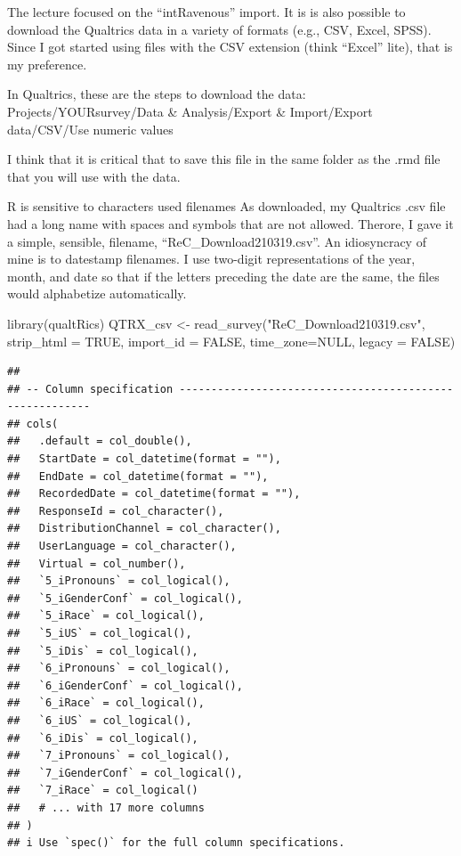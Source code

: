 \documentclass[
  english,
]{book}
\newenvironment{Shaded}{\begin{snugshade}}{\end{snugshade}}
\newcommand{\AttributeTok}[1]{\textcolor[rgb]{0.77,0.63,0.00}{#1}}
\newcommand{\ConstantTok}[1]{\textcolor[rgb]{0.00,0.00,0.00}{#1}}
\newcommand{\FunctionTok}[1]{\textcolor[rgb]{0.00,0.00,0.00}{#1}}
\newcommand{\NormalTok}[1]{#1}
\newcommand{\OtherTok}[1]{\textcolor[rgb]{0.56,0.35,0.01}{#1}}
\newcommand{\StringTok}[1]{\textcolor[rgb]{0.31,0.60,0.02}{#1}}
\begin{document}
The lecture focused on the ``intRavenous'' import. It is is also possible to download the Qualtrics data in a variety of formats (e.g., CSV, Excel, SPSS). Since I got started using files with the CSV extension (think ``Excel'' lite), that is my preference.

In Qualtrics, these are the steps to download the data: Projects/YOURsurvey/Data \& Analysis/Export \& Import/Export data/CSV/Use numeric values

I think that it is critical that to save this file in the same folder as the .rmd file that you will use with the data.

R is sensitive to characters used filenames As downloaded, my Qualtrics .csv file had a long name with spaces and symbols that are not allowed. Therore, I gave it a simple, sensible, filename, ``ReC\_Download210319.csv''. An idiosyncracy of mine is to datestamp filenames. I use two-digit representations of the year, month, and date so that if the letters preceding the date are the same, the files would alphabetize automatically.

\begin{Shaded}
\begin{Highlighting}[]
\FunctionTok{library}\NormalTok{(qualtRics)}
\NormalTok{QTRX\_csv }\OtherTok{\textless{}{-}} \FunctionTok{read\_survey}\NormalTok{(}\StringTok{"ReC\_Download210319.csv"}\NormalTok{, }\AttributeTok{strip\_html =} \ConstantTok{TRUE}\NormalTok{, }\AttributeTok{import\_id =} \ConstantTok{FALSE}\NormalTok{, }\AttributeTok{time\_zone=}\ConstantTok{NULL}\NormalTok{, }\AttributeTok{legacy =} \ConstantTok{FALSE}\NormalTok{)}
\end{Highlighting}
\end{Shaded}

\begin{verbatim}
## 
## -- Column specification --------------------------------------------------------
## cols(
##   .default = col_double(),
##   StartDate = col_datetime(format = ""),
##   EndDate = col_datetime(format = ""),
##   RecordedDate = col_datetime(format = ""),
##   ResponseId = col_character(),
##   DistributionChannel = col_character(),
##   UserLanguage = col_character(),
##   Virtual = col_number(),
##   `5_iPronouns` = col_logical(),
##   `5_iGenderConf` = col_logical(),
##   `5_iRace` = col_logical(),
##   `5_iUS` = col_logical(),
##   `5_iDis` = col_logical(),
##   `6_iPronouns` = col_logical(),
##   `6_iGenderConf` = col_logical(),
##   `6_iRace` = col_logical(),
##   `6_iUS` = col_logical(),
##   `6_iDis` = col_logical(),
##   `7_iPronouns` = col_logical(),
##   `7_iGenderConf` = col_logical(),
##   `7_iRace` = col_logical()
##   # ... with 17 more columns
## )
## i Use `spec()` for the full column specifications.
\end{verbatim}
\end{document}
